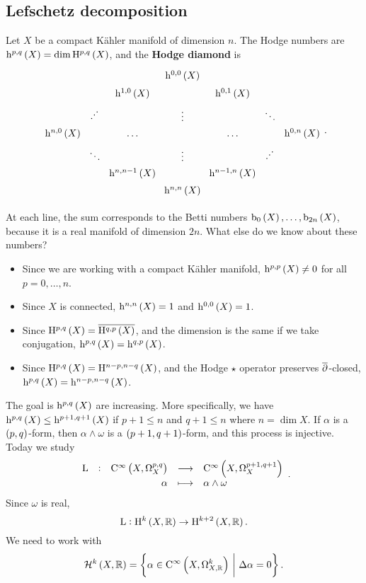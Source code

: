 \subsection{Lefschetz decomposition}


Let $ X $ be a compact K\"ahler manifold of dimension $ n $. The Hodge numbers are $ \h^{p, q}\br{X} = \dim \H^{p, q}\br{X} $, and the \textbf{Hodge diamond} is
$$
\begin{tikzcd}[column sep=0, row sep=0]
& & & \h^{0, 0}\br{X} & & & \\
& & \h^{1, 0}\br{X} & & \h^{0, 1}\br{X} & & \\
& {\displaystyle\cdot}^{{\displaystyle\cdot}^{\displaystyle\cdot}} & & \vdots & & \ddots & \\
\h^{n, 0}\br{X} & & \dots & & \dots & & \h^{0, n}\br{X} \\
& \ddots & & \vdots & & {\displaystyle\cdot}^{{\displaystyle\cdot}^{\displaystyle\cdot}} & \\
& & \h^{n, n - 1}\br{X} & & \h^{n - 1, n}\br{X} & & \\
& & & \h^{n, n}\br{X} & & &
\end{tikzcd}.
$$

\pagebreak

At each line, the sum corresponds to the Betti numbers $ \b_0\br{X}, \dots, \b_{2n}\br{X} $, because it is a real manifold of dimension $ 2n $. What else do we know about these numbers?
\begin{itemize}
\item Since we are working with a compact K\"ahler manifold, $ \h^{p, p}\br{X} \ne 0 $ for all $ p = 0, \dots, n $.
\item Since $ X $ is connected, $ \h^{n, n}\br{X} = 1 $ and $ \h^{0, 0}\br{X} = 1 $.
\item Since $ \H^{p, q}\br{X} = \overline{\H^{q, p}\br{X}} $, and the dimension is the same if we take conjugation, $ \h^{p, q}\br{X} = \h^{q, p}\br{X} $.
\item Since $ \H^{p, q}\br{X} = \H^{n - p, n - q}\br{X} $, and the Hodge $ \star $ operator preserves $ \overline{\partial} $-closed, $ \h^{p, q}\br{X} = \h^{n - p, n - q}\br{X} $.
\end{itemize}
The goal is $ \h^{p, q}\br{X} $ are increasing. More specifically, we have $ \h^{p, q}\br{X} \le \h^{p + 1, q + 1}\br{X} $ if $ p + 1 \le n $ and $ q + 1 \le n $ where $ n = \dim X $. If $ \alpha $ is a $ \br{p, q} $-form, then $ \alpha \wedge \omega $ is a $ \br{p + 1, q + 1} $-form, and this process is injective. Today we study
$$ \function[\L]{\CO{X}{p, q}}{\CO{X}{p + 1, q + 1}}{\alpha}{\alpha \wedge \omega}. $$
Since $ \omega $ is real,
$$ \L : \H^k\br{X, \RR} \to \H^{k + 2}\br{X, \RR}. $$
We need to work with
$$ \HHH^k\br{X, \RR} = \cbr{\alpha \in \Ci{X, \Omega_{X, \RR}^k} \st \Delta\alpha = 0}. $$

